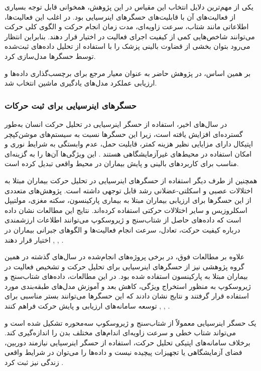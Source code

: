 یکی از مهم‌ترین دلایل انتخاب این مقیاس در این پژوهش، همخوانی قابل توجه بسیاری از فعالیت‌های آن با قابلیت‌های حسگرهای اینرسیایی بود. در اغلب این فعالیت‌ها، اطلاعاتی مانند شتاب، سرعت زاویه‌ای، مدت زمان انجام حرکت و الگوی کلی حرکت می‌توانند شاخص‌هایی کمی از کیفیت اجرای فعالیت در اختیار قرار دهند. بنابراین انتظار می‌رود بتوان بخشی از قضاوت بالینی پزشک را با استفاده از تحلیل داده‌های ثبت‌شده توسط حسگرها مدل‌سازی کرد.

بر همین اساس، در پژوهش حاضر  به عنوان معیار مرجع برای برچسب‌گذاری داده‌ها و ارزیابی عملکرد مدل‌های یادگیری ماشین انتخاب شد. 

\subsubsection{حسگرهای اینرسیایی برای ثبت حرکات}

در سال‌های اخیر، استفاده از حسگر اینرسیایی در تحلیل حرکت انسان به‌طور گسترده‌ای افزایش یافته است، زیرا این حسگرها نسبت به سیستم‌های موشن‌کپچر اپتیکال دارای مزایایی نظیر هزینه کمتر، قابلیت حمل، عدم وابستگی به شرایط نوری و امکان استفاده در محیط‌های غیرآزمایشگاهی هستند
 \cite{MuroDeLaHerran2014Wearable}. 
 این ویژگی‌ها آن‌ها را به گزینه‌ای مناسب برای کاربردهای بالینی و پایش بیماران در محیط واقعی تبدیل کرده است.

همچنین از طرف دیگر استفاده از حسگرهای اینرسیایی در تحلیل حرکت بیماران مبتلا به اختلالات عصبی و اسکلتی-عضلانی رشد قابل توجهی داشته است. پژوهش‌های متعددی از این حسگرها برای ارزیابی بیماران مبتلا به بیماری پارکینسون، سکته مغزی، مولتیپل اسکلروزیس و سایر اختلالات حرکتی استفاده کرده‌اند. نتایج این مطالعات نشان داده است که داده‌های حاصل از شتاب‌سنج و ژیروسکوپ می‌توانند اطلاعات ارزشمندی درباره کیفیت حرکت، تعادل، سرعت انجام فعالیت‌ها و الگوهای جبرانی بیماران در اختیار قرار دهند 
\cite{Patel2012Wearable},
\cite{Bonato2010Wearable},
\cite{Lara2013Survey}.

علاوه بر مطالعات فوق، در برخی پروژه‌های انجام‌شده در سال‌های گذشته در همین گروه پژوهشی نیز از حسگرهای اینرسیایی برای تحلیل حرکت و تشخیص فعالیت در بیماران مبتلا به پارکینسون استفاده شده بود. در این مطالعات، داده‌های شتاب‌سنج و ژیروسکوپ به منظور استخراج ویژگی، کاهش بعد و آموزش مدل‌های طبقه‌بندی مورد استفاده قرار گرفتند و نتایج نشان دادند که این حسگرها می‌توانند بستر مناسبی برای توسعه سامانه‌های ارزیابی و پایش حرکت فراهم کنند 
\cite{Partovi2023Thesis},
\cite{Ejtehadi2022Thesis},
\cite{Nasrabadi2019Thesis}.


یک حسگر اینرسیایی معمولاً از شتاب‌سنج و ژیروسکوپ سه‌محوره تشکیل شده است و می‌تواند شتاب خطی و سرعت زاویه‌ای اندام‌های مختلف بدن را اندازه‌گیری کند. برخلاف سامانه‌های اپتیکی تحلیل حرکت، استفاده از حسگر اینرسیایی نیازمند دوربین، فضای آزمایشگاهی یا تجهیزات پیچیده نیست و داده‌ها را می‌توان در شرایط واقعی زندگی نیز ثبت کرد
 \cite{Sabatini2011IMU}.

